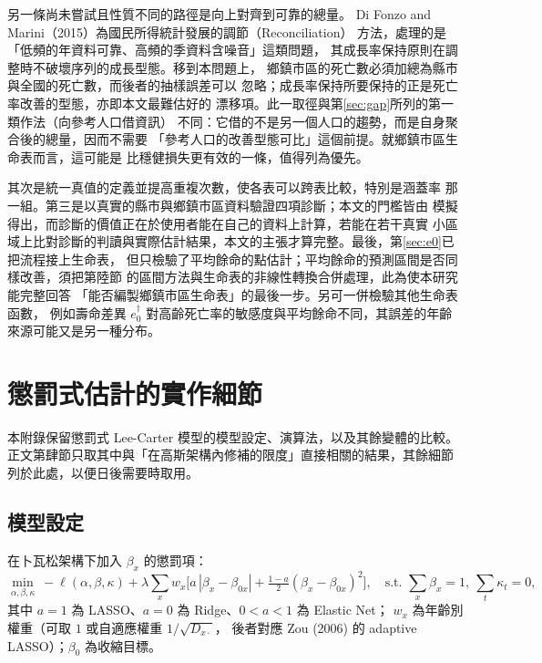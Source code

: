 \documentclass[UTF8, fontset=macnew, a4paper, 12pt]{ctexart}
\newcommand{\bignum}[1]{\ifcase#1\or 壹\or 貳\or 參\or 肆\or 伍\or
  陸\or 柒\or 捌\or 玖\or 拾\fi}
\renewcommand{\thesection}{\bignum{\value{section}}}
\newcommand{\edag}{e_0^{\dagger}}
\begin{document}
另一條尚未嘗試且性質不同的路徑是向上對齊到可靠的總量。
Di Fonzo and Marini（2015）為國民所得統計發展的調節（Reconciliation）
方法，處理的是「低頻的年資料可靠、高頻的季資料含噪音」這類問題，
其成長率保持原則在調整時不破壞序列的成長型態。移到本問題上，
鄉鎮市區的死亡數必須加總為縣市與全國的死亡數，而後者的抽樣誤差可以
忽略；成長率保持所要保持的正是死亡率改善的型態，亦即本文最難估好的
漂移項。此一取徑與第\ref{sec:gap}所列的第一類作法（向參考人口借資訊）
不同：它借的不是另一個人口的趨勢，而是自身聚合後的總量，因而不需要
「參考人口的改善型態可比」這個前提。就鄉鎮市區生命表而言，這可能是
比穩健損失更有效的一條，值得列為優先。

其次是統一真值的定義並提高重複次數，使各表可以跨表比較，特別是涵蓋率
那一組。第三是以真實的縣市與鄉鎮市區資料驗證四項診斷；本文的門檻皆由
模擬得出，而診斷的價值正在於使用者能在自己的資料上計算，若能在若干真實
小區域上比對診斷的判讀與實際估計結果，本文的主張才算完整。最後，第\ref{sec:e0}已把流程接上生命表，
但只檢驗了平均餘命的點估計；平均餘命的預測區間是否同樣改善，須把第陸節
的區間方法與生命表的非線性轉換合併處理，此為使本研究能完整回答
「能否編製鄉鎮市區生命表」的最後一步。另可一併檢驗其他生命表函數，
例如壽命差異 $\edag$ 對高齡死亡率的敏感度與平均餘命不同，其誤差的年齡
來源可能又是另一種分布。

\appendix
\renewcommand{\thesection}{附錄\Alph{section}}
\setcounter{section}{0}

\section{懲罰式估計的實作細節}\label{sec:apppen}

本附錄保留懲罰式 Lee-Carter 模型的模型設定、演算法，以及其餘變體的比較。
正文第肆節只取其中與「在高斯架構內修補的限度」直接相關的結果，其餘細節
列於此處，以便日後需要時取用。

\subsection{模型設定}

在卜瓦松架構下加入 $\beta_x$ 的懲罰項：
\begin{equation}
\min_{\alpha,\beta,\kappa}\ -\ell(\alpha,\beta,\kappa)
+\lambda\sum_x w_x\Big[a\,|\beta_x-\beta_{0x}|
+\tfrac{1-a}{2}(\beta_x-\beta_{0x})^2\Big],
\quad \text{s.t. } \sum_x\beta_x=1,\ \sum_t\kappa_t=0,
\end{equation}
其中 $a=1$ 為 LASSO、$a=0$ 為 Ridge、$0<a<1$ 為 Elastic Net；
$w_x$ 為年齡別權重（可取 $1$ 或自適應權重 $1/\sqrt{D_{x\cdot}}$，
後者對應 Zou (2006) 的 adaptive LASSO）；$\beta_0$ 為收縮目標。
\end{document}
